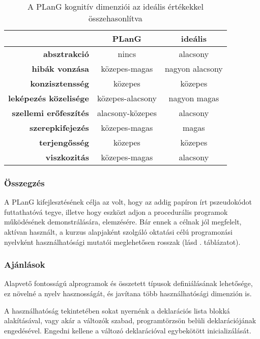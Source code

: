 \begin{table}[tb]
	\centering
	\begin{tabular}{ r c c }
						& \bfseries PLanG	 & \bfseries ideális \\ \hline
		\bfseries absztrakció 		&\cellcolor{red!30}nincs & alacsony \\
		\bfseries hibák vonzása 	&\cellcolor{red!30}közepes-magas & nagyon alacsony \\
		\bfseries konzisztensség 	&\cellcolor{yellow!30}közepes & közepes  \\
		\bfseries leképezés közelisége &\cellcolor{red!30}közepes-alacsony & nagyon magas \\
		\bfseries szellemi erőfeszítés &\cellcolor{green!30}alacsony-közepes & alacsony \\
		\bfseries szerepkifejezés &\cellcolor{green!30}közepes-magas	& magas \\
		\bfseries terjengősség &\cellcolor{yellow!30}közepes	& közepes \\
		\bfseries viszkozitás &\cellcolor{red!30}közepes-magas	& alacsony
	\end{tabular}
	\caption{A PLanG kognitív dimenziói az ideális értékekkel összehasonlítva}
	\label{tab:plangminmut}
\end{table}


\subsubsection{Összegzés}
A PLanG kifejlesztésének célja az volt, hogy az addig papíron írt pszeudokódot futtathatóvá tegye, illetve hogy eszközt adjon a procedurális programok működésének demonstrálására, elemzésére\cite{lovei}.
Bár ennek a célnak jól megfelelt, aktívan használt, a kurzus alapjaként szolgáló oktatási célú programozási nyelvként használhatósági mutatói meglehetősen rosszak (lásd . táblázatot).


\subsubsection{Ajánlások}
Alapvető fontosságú alprogramok és összetett típusok definiálásának lehetősége, ez növelné a nyelv hasznosságát, és javítana több használhatósági dimenzión is.

A használhatóság tekintetében sokat nyernénk a deklarációs lista blokká alakításával, vagy akár a változók szabad, programtörzsön belüli deklarációjának engedésével. Engedni kellene a változó deklarációval egybekötött inicializálását.

